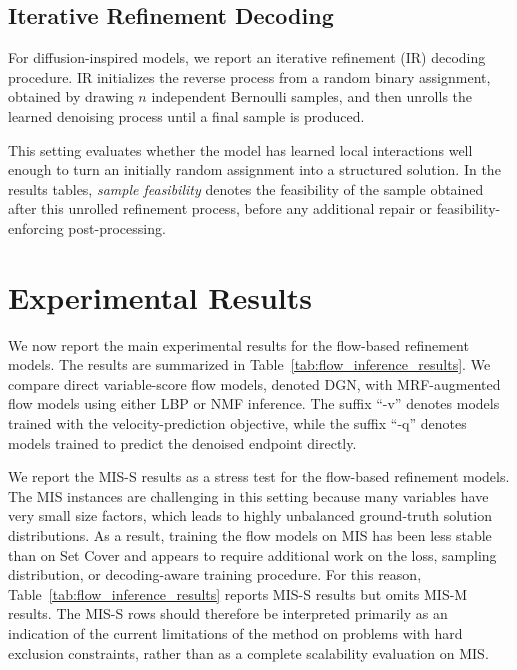 \subsection{Iterative Refinement Decoding}
\label{subsec:iterative-refinement-decoding}

For diffusion-inspired models, we report an iterative refinement (IR) decoding procedure. IR initializes the reverse process from a random binary assignment, obtained by drawing $n$ independent Bernoulli samples, and then unrolls the learned denoising process until a final sample is produced.

This setting evaluates whether the model has learned local interactions well enough to turn an initially random assignment into a structured solution. In the results tables, \emph{sample feasibility} denotes the feasibility of the sample obtained after this unrolled refinement process, before any additional repair or feasibility-enforcing post-processing.

\section{Experimental Results}
\label{sec:chapter_4_main_results}

We now report the main experimental results for the flow-based refinement models. The results are summarized in Table~\ref{tab:flow_inference_results}. We compare direct variable-score flow models, denoted DGN, with MRF-augmented flow models using either LBP or NMF inference. The suffix ``-v'' denotes models trained with the velocity-prediction objective, while the suffix ``-q'' denotes models trained to predict the denoised endpoint directly.

We report the MIS-S results as a stress test for the flow-based refinement models. The MIS instances are challenging in this setting because many variables have very small size factors, which leads to highly unbalanced ground-truth solution distributions. As a result, training the flow models on MIS has been less stable than on Set Cover and appears to require additional work on the loss, sampling distribution, or decoding-aware training procedure. For this reason, Table~\ref{tab:flow_inference_results} reports MIS-S results but omits MIS-M results. The MIS-S rows should therefore be interpreted primarily as an indication of the current limitations of the method on problems with hard exclusion constraints, rather than as a complete scalability evaluation on MIS.

